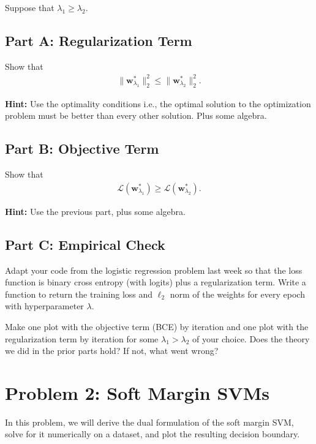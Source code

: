 \documentclass{article}
\begin{document}
Suppose that $\lambda_1 \geq \lambda_2$.

\subsection*{Part A: Regularization Term}

Show that
\begin{align}
    \| \mathbf{w}^*_{\lambda_1} \|_2^2 \leq
    \| \mathbf{w}^*_{\lambda_2} \|_2^2.
\end{align}

\textbf{Hint:} Use the optimality conditions i.e., the optimal solution to the optimization problem must be better than every other solution. Plus some algebra.


\subsection*{Part B: Objective Term}

Show that
\begin{align}
    \mathcal{L}(\mathbf{w}^*_{\lambda_1}) \geq
    \mathcal{L}(\mathbf{w}^*_{\lambda_2}).
\end{align}

\textbf{Hint:} Use the previous part, plus some algebra.

\subsection*{Part C: Empirical Check}

Adapt your code from the logistic regression problem last week so that the loss function is binary cross entropy (with logits) plus a regularization term.
Write a function to return the training loss and $\ell_2$ norm of the weights for every epoch with hyperparameter $\lambda$.

Make one plot with the objective term (BCE) by iteration and one plot with the regularization term by iteration for some $\lambda_1 > \lambda_2$ of your choice.
Does the theory we did in the prior parts hold?
If not, what went wrong?

%

\newpage
\section*{Problem 2: Soft Margin SVMs}

In this problem, we will derive the dual formulation of the soft margin SVM, solve for it numerically on a dataset, and plot the resulting decision boundary.
\end{document}
